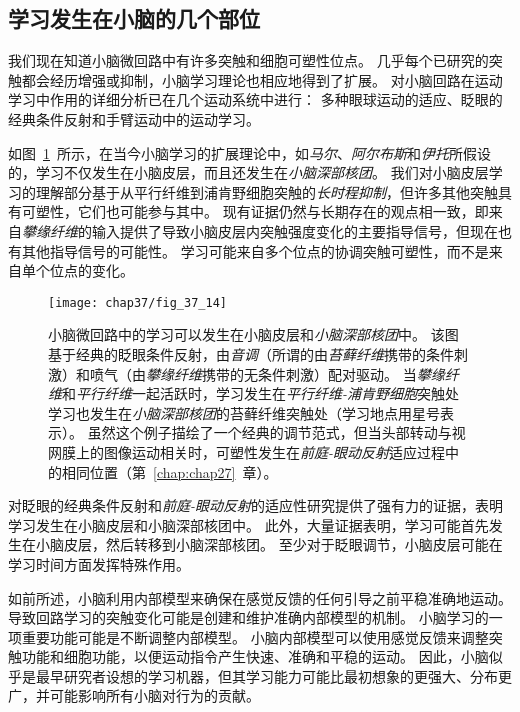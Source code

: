 \subsection{学习发生在小脑的几个部位}

我们现在知道小脑微回路中有许多突触和细胞可塑性位点。
几乎每个已研究的突触都会经历增强或抑制，小脑学习理论也相应地得到了扩展。
对小脑回路在运动学习中作用的详细分析已在几个运动系统中进行：
多种眼球运动的适应、眨眼的经典条件反射和手臂运动中的运动学习。


如图~\ref{fig:37_14}~所示，在当今小脑学习的扩展理论中，如\textit{马尔}、\textit{阿尔布斯}和\textit{伊托}所假设的，学习不仅发生在小脑皮层，而且还发生在\textit{小脑深部核团}。
我们对小脑皮层学习的理解部分基于从平行纤维到浦肯野细胞突触的\textit{长时程抑制}，但许多其他突触具有可塑性，它们也可能参与其中。
现有证据仍然与长期存在的观点相一致，即来自\textit{攀缘纤维}的输入提供了导致小脑皮层内突触强度变化的主要指导信号，但现在也有其他指导信号的可能性。
学习可能来自多个位点的协调突触可塑性，而不是来自单个位点的变化。


\begin{figure}[htbp]
	\centering
	\texttt{[image: chap37/fig\_37\_14]}
	\caption{小脑微回路中的学习可以发生在小脑皮层和\textit{小脑深部核团}中。
		该图基于经典的眨眼条件反射，由\textit{音调}（所谓的由\textit{苔藓纤维}携带的条件刺激）和喷气（由\textit{攀缘纤维}携带的无条件刺激）配对驱动。
		当\textit{攀缘纤维}和\textit{平行纤维}一起活跃时，学习发生在\textit{平行纤维-浦肯野细胞}突触处
		学习也发生在\textit{小脑深部核团}的苔藓纤维突触处（学习地点用星号表示）。
		虽然这个例子描绘了一个经典的调节范式，但当头部转动与视网膜上的图像运动相关时，可塑性发生在\textit{前庭-眼动反射}适应过程中的相同位置（第~\ref{chap:chap27}~章）\cite{carey2002embarrassed}。}
	\label{fig:37_14}
\end{figure}


对眨眼的经典条件反射和\textit{前庭-眼动反射}的适应性研究提供了强有力的证据，表明学习发生在小脑皮层和小脑深部核团中。
此外，大量证据表明，学习可能首先发生在小脑皮层，然后转移到小脑深部核团。
至少对于眨眼调节，小脑皮层可能在学习时间方面发挥特殊作用。


如前所述，小脑利用内部模型来确保在感觉反馈的任何引导之前平稳准确地运动。
导致回路学习的突触变化可能是创建和维护准确内部模型的机制。
小脑学习的一项重要功能可能是不断调整内部模型。
小脑内部模型可以使用感觉反馈来调整突触功能和细胞功能，以便运动指令产生快速、准确和平稳的运动。
因此，小脑似乎是最早研究者设想的学习机器，但其学习能力可能比最初想象的更强大、分布更广，并可能影响所有小脑对行为的贡献。




